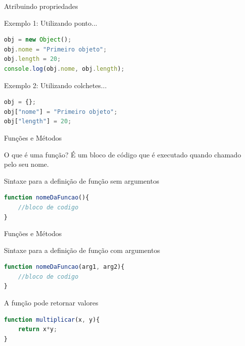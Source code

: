 \documentclass[xcolor=dvipsnames,table]{beamer}
\begin{document}
\begin{frame}[fragile]{Atribuindo propriedades}
	\begin{block}{Exemplo 1: Utilizando ponto...}
		\begin{lstlisting}[language=JavaScript]
obj = new Object();
obj.nome = "Primeiro objeto";
obj.length = 20;
console.log(obj.nome, obj.length);
\end{lstlisting}	
	\end{block} 
	\begin{block}{Exemplo 2: Utilizando colchetes...}
		\begin{lstlisting}[language=JavaScript]
obj = {};
obj["nome"] = "Primeiro objeto";
obj["length"] = 20;
\end{lstlisting}	
	\end{block}
\end{frame}

\begin{frame}[fragile]{Funções e Métodos}
	\begin{block}{O que é uma função?}
		É um bloco de código que é executado quando chamado pelo seu nome.
	\end{block} 
	\begin{block}{Sintaxe para a definição de função sem argumentos}
		\begin{lstlisting}[language=JavaScript]
function nomeDaFuncao(){
	//bloco de codigo
}
\end{lstlisting}	
	\end{block}
\end{frame}

\begin{frame}[fragile]{Funções e Métodos}
	\begin{block}{Sintaxe para a definição de função com argumentos}
		\begin{lstlisting}[language=JavaScript]
function nomeDaFuncao(arg1, arg2){
	//bloco de codigo
}
\end{lstlisting}	
	\end{block} 
	\begin{block}{A função pode retornar valores}
		\begin{lstlisting}[language=JavaScript]
function multiplicar(x, y){
	return x*y;
}
\end{lstlisting}	
	\end{block}
\end{frame}
\end{document}
